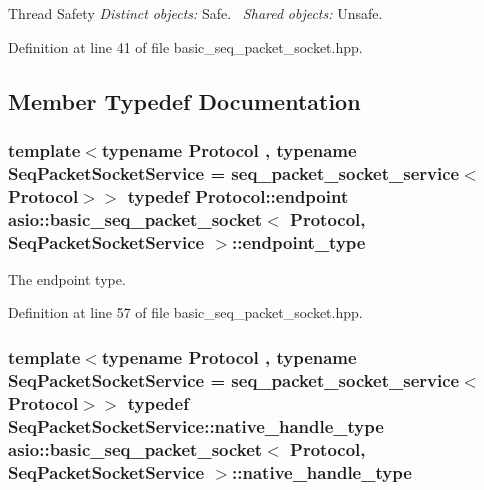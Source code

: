 \begin{DoxyParagraph}{Thread Safety}
{\itshape Distinct} {\itshape objects\+:} Safe.~\newline
{\itshape Shared} {\itshape objects\+:} Unsafe. 
\end{DoxyParagraph}


Definition at line 41 of file basic\+\_\+seq\+\_\+packet\+\_\+socket.\+hpp.



\subsection{Member Typedef Documentation}
\hypertarget{classasio_1_1basic__seq__packet__socket_ad5f8549d940cf2c9325b02398910e98f}{}
\subsubsection[{endpoint\+\_\+type}]{\setlength{\rightskip}{0pt plus 5cm}template$<$typename Protocol , typename Seq\+Packet\+Socket\+Service  = seq\+\_\+packet\+\_\+socket\+\_\+service$<$\+Protocol$>$$>$ typedef Protocol\+::endpoint {\bf asio\+::basic\+\_\+seq\+\_\+packet\+\_\+socket}$<$ Protocol, Seq\+Packet\+Socket\+Service $>$\+::{\bf endpoint\+\_\+type}}\label{classasio_1_1basic__seq__packet__socket_ad5f8549d940cf2c9325b02398910e98f}


The endpoint type. 



Definition at line 57 of file basic\+\_\+seq\+\_\+packet\+\_\+socket.\+hpp.

\hypertarget{classasio_1_1basic__seq__packet__socket_aab4f35462c8d5eecf380d50336984ccd}{}
\subsubsection[{native\+\_\+handle\+\_\+type}]{\setlength{\rightskip}{0pt plus 5cm}template$<$typename Protocol , typename Seq\+Packet\+Socket\+Service  = seq\+\_\+packet\+\_\+socket\+\_\+service$<$\+Protocol$>$$>$ typedef Seq\+Packet\+Socket\+Service\+::native\+\_\+handle\+\_\+type {\bf asio\+::basic\+\_\+seq\+\_\+packet\+\_\+socket}$<$ Protocol, Seq\+Packet\+Socket\+Service $>$\+::{\bf native\+\_\+handle\+\_\+type}}\label{classasio_1_1basic__seq__packet__socket_aab4f35462c8d5eecf380d50336984ccd}


